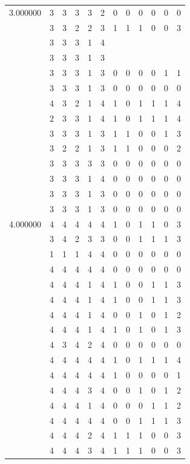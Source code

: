 \documentclass[]{book}
\theoremstyle{definition}
\theoremstyle{definition}
\theoremstyle{definition}
\theoremstyle{remark}
\begin{document}
\begin{table}
{\begin{tabular}[t]{rrrrrrrrrrrr}
3.000000 & 3 & 3 & 3 & 3 & 2 & 0 & 0 & 0 & 0 & 0 & 0\\
 & 3 & 3 & 2 & 2 & 3 & 1 & 1 & 1 & 0 & 0 & 3\\
 & 3 & 3 & 3 & 1 & 4 &  &  &  &  &  & \\
 & 3 & 3 & 3 & 1 & 3 &  &  &  &  &  & \\
 & 3 & 3 & 3 & 1 & 3 & 0 & 0 & 0 & 0 & 1 & 1\\
 & 3 & 3 & 3 & 1 & 3 & 0 & 0 & 0 & 0 & 0 & 0\\
 & 4 & 3 & 2 & 1 & 4 & 1 & 0 & 1 & 1 & 1 & 4\\
 & 2 & 3 & 3 & 1 & 4 & 1 & 0 & 1 & 1 & 1 & 4\\
 & 3 & 3 & 3 & 1 & 3 & 1 & 1 & 0 & 0 & 1 & 3\\
 & 3 & 2 & 2 & 1 & 3 & 1 & 1 & 0 & 0 & 0 & 2\\
 & 3 & 3 & 3 & 3 & 3 & 0 & 0 & 0 & 0 & 0 & 0\\
 & 3 & 3 & 3 & 1 & 4 & 0 & 0 & 0 & 0 & 0 & 0\\
 & 3 & 3 & 3 & 1 & 3 & 0 & 0 & 0 & 0 & 0 & 0\\
 & 3 & 3 & 3 & 1 & 3 & 0 & 0 & 0 & 0 & 0 & 0\\
4.000000 & 4 & 4 & 4 & 4 & 4 & 1 & 0 & 1 & 1 & 0 & 3\\
 & 3 & 4 & 2 & 3 & 3 & 0 & 0 & 1 & 1 & 1 & 3\\
 & 1 & 1 & 1 & 4 & 4 & 0 & 0 & 0 & 0 & 0 & 0\\
 & 4 & 4 & 4 & 4 & 4 & 0 & 0 & 0 & 0 & 0 & 0\\
 & 4 & 4 & 4 & 1 & 4 & 1 & 0 & 0 & 1 & 1 & 3\\
 & 4 & 4 & 4 & 1 & 4 & 1 & 0 & 0 & 1 & 1 & 3\\
 & 4 & 4 & 4 & 1 & 4 & 0 & 0 & 1 & 0 & 1 & 2\\
 & 4 & 4 & 4 & 1 & 4 & 1 & 0 & 1 & 0 & 1 & 3\\
 & 4 & 3 & 4 & 2 & 4 & 0 & 0 & 0 & 0 & 0 & 0\\
 & 4 & 4 & 4 & 4 & 4 & 1 & 0 & 1 & 1 & 1 & 4\\
 & 4 & 4 & 4 & 4 & 4 & 1 & 0 & 0 & 0 & 0 & 1\\
 & 4 & 4 & 4 & 3 & 4 & 0 & 0 & 1 & 0 & 1 & 2\\
 & 4 & 4 & 4 & 1 & 4 & 0 & 0 & 0 & 1 & 1 & 2\\
 & 4 & 4 & 4 & 4 & 4 & 0 & 0 & 1 & 1 & 1 & 3\\
 & 4 & 4 & 4 & 2 & 4 & 1 & 1 & 1 & 0 & 0 & 3\\
 & 4 & 4 & 4 & 3 & 4 & 1 & 1 & 1 & 0 & 0 & 3\\

\end{tabular}}
\end{table}
\end{document}
